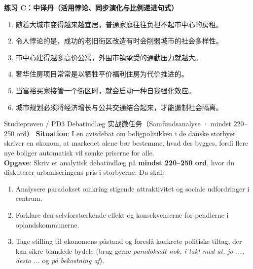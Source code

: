 \textbf{练习 C：中译丹（活用悖论、同步演化与比例递进句式）}
\begin{enumerate}
  \item 随着大城市变得越来越宜居，普通家庭往往负担不起市中心的房租。
  \item 令人悖论的是，成功的老旧街区改造有时会削弱城市的社会多样性。
  \item 市中心建得越多高价公寓，外围市镇承受的通勤压力就越大。
  \item 奢华住房项目常常是以牺牲平价福利住房为代价推进的。
  \item 当富裕买家接管一个街区时，就会启动一种自我强化效应。
  \item 城市规划必须将经济增长与公共交通结合起来，才能遏制社会隔离。
\end{enumerate}


\begin{emailbox}{Studieprøven / PD3 Debatindlæg 实战微任务（Samfundsanalyse · mindst 220--250 ord）}
\textbf{Situation}: I en avisdebat om boligpolitikken i de danske storbyer skriver en økonom, at markedet alene bør bestemme, hvad der bygges, fordi flere nye boliger automatisk vil sænke priserne for alle.\\
\textbf{Opgave}: Skriv et analytisk debatindlæg på \textbf{mindst 220--250 ord}, hvor du diskuterer urbaniseringens pris i storbyerne. Du skal:
\begin{enumerate}
  \item Analysere paradokset omkring stigende attraktivitet og sociale udfordringer i centrum.
  \item Forklare den selvforstærkende effekt og konsekvenserne for pendlerne i oplandskommunerne.
  \item Tage stilling til økonomens påstand og foreslå konkrete politiske tiltag, der kan sikre blandede bydele (brug gerne \textit{paradoksalt nok, i takt med at, jo ..., desto ...} og \textit{på bekostning af}).
\end{enumerate}
\end{emailbox}

